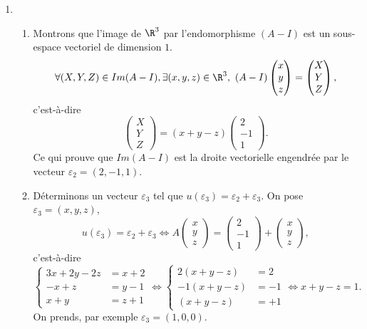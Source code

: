 {{\begin {enumerate}
Il existe des polyn\^omes $S$ et $R$, avec $d^{\circ}R<d^{\circ}P$ ou $R=0$, tels que 
$$Q(X)=S(X)(X-1)^2+R(X).$$
Notons $R(X)=aX+b$ ($R(X)$ est de degr\'e $1$ car $P$ est de degr\'e 2) et d\'erivons, on obtient
$$Q'(X)=S'(X)(X-1)^2+2(X-1)S(X)+a,$$
on a donc $Q(1)=R(1)=a+b$ et $Q'(1)=a$, c'est-\`a-dire $a=Q'(1)$ et $b=Q(1)-Q'(1)$ d'o\`u
$$R(X)=Q'(1)X+(Q(1)-Q'(1)).$$
D'apr\`es la question $2)$, on remarque que $P(A)=0$, en choisissant le polyn\^ome $Q(X)=X^n$ on a
$Q(1)=1$ et $Q'(1)=n$, donc 
$$Q(A)=A^n=R(A)=Q'(1)A+(Q(1)-Q'(1))I=nA+(1-n)I.$$ 
  \item
  \begin {enumerate}
    \item  Montrons que l'image de $\R^3$ par l'endomorphisme $(A-I)$ est un sous-espace vectoriel de dimension $1$.
$$\forall(X,Y,Z)\in Im (A-I), \exists (x,y,z)\in\R^3,\ (A-I)\begin{pmatrix}x \\  y \\  z\end{pmatrix}
=\begin{pmatrix}X \\  Y \\  Z\end{pmatrix},$$
c'est-\`a-dire
$$\begin{pmatrix}X \\  Y \\  Z\end{pmatrix}=(x+y-z)\begin{pmatrix}2 \\  -1 \\  1\end{pmatrix}.$$
Ce qui prouve que $Im(A-I)$ est la droite vectorielle engendr\'ee par le vecteur 
$\varepsilon_2=(2,-1,1)$.

    \item D\'eterminons un vecteur $\varepsilon_3$ tel que $u(\varepsilon_3)=\varepsilon_2+\varepsilon_3$.
On pose $\varepsilon_3=(x,y,z)$,
$$u(\varepsilon_3)=\varepsilon_2+\varepsilon_3\iff A\begin{pmatrix}x \\  y \\  z\end{pmatrix}
=\begin{pmatrix}2 \\  -1 \\  1\end{pmatrix}+\begin{pmatrix}x \\  y \\  z\end{pmatrix},$$
c'est-\`a-dire
$$\left\{\begin{align*}3x+2y-2z &= x+2 \\  -x+z &=y-1 \\  x+y &=z+1\end{align*}\right.\iff
\left\{\begin{align*}2(x+y-z) &= 2 \\ -1(x+y-z) &=-1 \\  (x+y-z) &=+1\end{align*}\right.\iff x+y-z=1.$$
On prends, par exemple $\varepsilon_3=(1,0,0)$.


\end{enumerate}
\end{enumerate}}}
